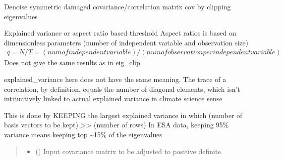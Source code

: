\documentclass[letterpaper,10pt,english]{sphinxmanual}
\begin{document}

\begin{fulllineitems}
\label{\detokenize{misc:glomar_gridding.covariance_tools.eigenvalue_clip}}
\pysigstartsignatures
\pysiglinewithargsret
{}
{\sphinxparamcomma {}\sphinxparamcomma {}}
{}
\pysigstopsignatures
\sphinxAtStartPar
Denoise symmetric damaged covariance/correlation matrix cov by clipping
eigenvalues

\sphinxAtStartPar
Explained variance or aspect ratio based threshold
Aspect ratios is based on dimensionless parameters
(number of independent variable and observation size)
\begin{equation*}
\begin{split}q = N/T = (num of independent variable)
/ (num of observation per independent variable)\end{split}
\end{equation*}
\sphinxAtStartPar
Does not give the same results as in eig\_clip

\sphinxAtStartPar
explained\_variance here does not have the same meaning.
The trace of a correlation, by definition, equals the number of diagonal
elements, which isn’t intituatively linked to actual explained variance
in climate science sense

\sphinxAtStartPar
This is done by KEEPING the largest explained variance
in which (number of basis vectors to be kept) \textgreater{}\textgreater{} (number of rows)
In ESA data, keeping 95\% variance means keeping top \textasciitilde{}15\% of the
eigenvalues
\begin{quote}\begin{description}
\begin{itemize}
\item {}
\sphinxAtStartPar
{} () \textendash{} Input covariance matrix to be adjusted to positive definite.


\end{itemize}
\end{description}
\end{quote}
\end{fulllineitems}
\end{document}
